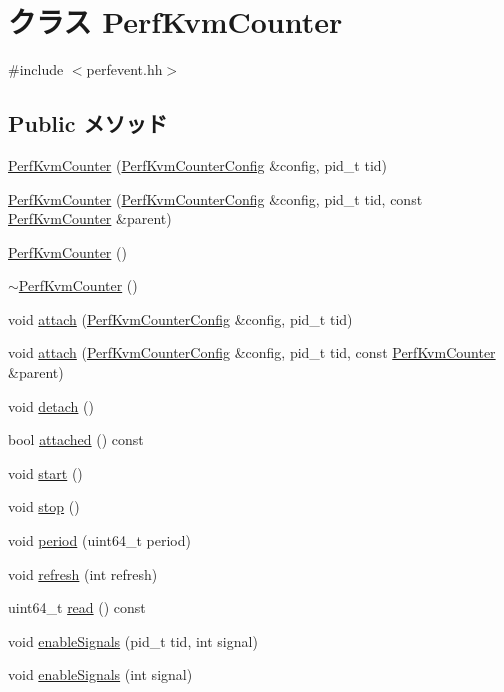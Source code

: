 \hypertarget{classPerfKvmCounter}{
\section{クラス PerfKvmCounter}
\label{classPerfKvmCounter}
}


{\ttfamily \#include $<$perfevent.hh$>$}\subsection*{Public メソッド}
\begin{DoxyCompactItemize}
\item 
\hyperlink{classPerfKvmCounter_a3efef81d1d840ff948b8fd501310c981}{PerfKvmCounter} (\hyperlink{classPerfKvmCounterConfig}{PerfKvmCounterConfig} \&config, pid\_\-t tid)
\item 
\hyperlink{classPerfKvmCounter_a6e10b934e1d000c59742d748b42824bd}{PerfKvmCounter} (\hyperlink{classPerfKvmCounterConfig}{PerfKvmCounterConfig} \&config, pid\_\-t tid, const \hyperlink{classPerfKvmCounter}{PerfKvmCounter} \&parent)
\item 
\hyperlink{classPerfKvmCounter_a48fc3925e8430dcead140f4c27a1e4ce}{PerfKvmCounter} ()
\item 
\hyperlink{classPerfKvmCounter_afadd01640b4cbc3b749f702d60e7a04b}{$\sim$PerfKvmCounter} ()
\item 
void \hyperlink{classPerfKvmCounter_a162e5b205959ecba29def7e7e0bf92dd}{attach} (\hyperlink{classPerfKvmCounterConfig}{PerfKvmCounterConfig} \&config, pid\_\-t tid)
\item 
void \hyperlink{classPerfKvmCounter_aff7cff5a84dcc4e3155c42b9b3f35574}{attach} (\hyperlink{classPerfKvmCounterConfig}{PerfKvmCounterConfig} \&config, pid\_\-t tid, const \hyperlink{classPerfKvmCounter}{PerfKvmCounter} \&parent)
\item 
void \hyperlink{classPerfKvmCounter_ac295bade8aee589f6718dfa79edc2a34}{detach} ()
\item 
bool \hyperlink{classPerfKvmCounter_aa828991b44e099ad372a7833c34d3e24}{attached} () const 
\item 
void \hyperlink{classPerfKvmCounter_a60de64d75454385b23995437f1d72669}{start} ()
\item 
void \hyperlink{classPerfKvmCounter_a8c528baf37154d347366083f0f816846}{stop} ()
\item 
void \hyperlink{classPerfKvmCounter_a08ec1e452f32c7b0e573d63f126a2bbf}{period} (uint64\_\-t period)
\item 
void \hyperlink{classPerfKvmCounter_a6af1a045627841dd5b66f15c28cb48e7}{refresh} (int refresh)
\item 
uint64\_\-t \hyperlink{classPerfKvmCounter_af2c9c37fc5a5bcdac6d97825066ce801}{read} () const 
\item 
void \hyperlink{classPerfKvmCounter_adcb1192220b2f38f9e05b5c8a0f3ab30}{enableSignals} (pid\_\-t tid, int signal)
\item 
void \hyperlink{classPerfKvmCounter_ab176640bca1358eda4cd412c3be7d746}{enableSignals} (int signal)
\end{DoxyCompactItemize}
